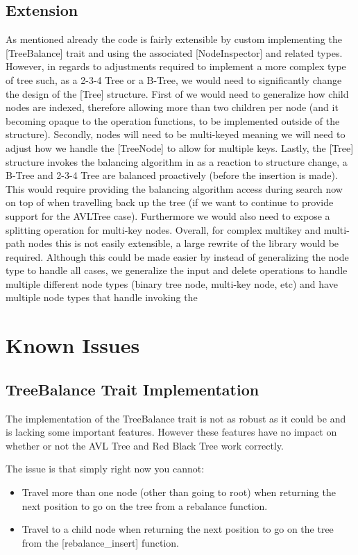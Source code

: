 \documentclass[12pt, letterpaper]{article}
\begin{document}
\subsection{Extension}
As mentioned already the code is fairly extensible by custom implementing the [TreeBalance] trait and using the associated
[NodeInspector] and related types.  However, in regards to adjustments required to implement a more complex type of tree such, as a 2-3-4 Tree or a B-Tree,
we would need to significantly change the design of the [Tree] structure.  First of we would need to generalize how child nodes are indexed, therefore allowing
more than two children per node (and it becoming opaque to the operation functions, to be implemented outside of the structure).
Secondly, nodes will need to be multi-keyed meaning we will need to adjust how we handle the [TreeNode] to allow for multiple keys.
Lastly, the [Tree] structure invokes the balancing algorithm in as a reaction to structure change, a B-Tree and 2-3-4 Tree are balanced
proactively (before the insertion is made).  This would require providing the balancing algorithm access during search now on top of when travelling back up the tree
(if we want to continue to provide support for the AVLTree case).  Furthermore we would also need to expose a splitting operation for multi-key nodes.
Overall, for complex multikey and multi-path nodes this is not easily extensible, a large rewrite of the library would be required.
Although this could be made easier by instead of generalizing the node type to handle all cases, we generalize the input and delete operations to handle
multiple different node types (binary tree node, multi-key node, etc) and have multiple node types that handle invoking the 

\section{Known Issues}

\subsection{TreeBalance Trait Implementation}
The implementation of the TreeBalance trait is not as robust as it could be and is lacking some important features.
However these features have no impact on whether or not the AVL Tree and Red Black Tree work correctly.

\noindent The issue is that simply right now you cannot:
\begin{itemize}
    \item Travel more than one node (other than going to root) when returning the next position to go on the tree from a rebalance function.
    \item Travel to a child node when returning the next position to go on the tree from the [rebalance\_insert] function.
\end{itemize}
\end{document}
